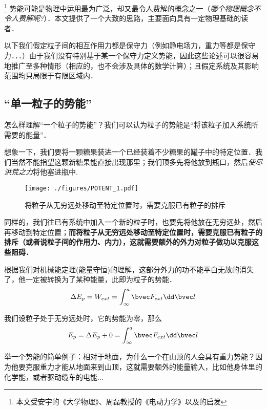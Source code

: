 

\begin{issues}
\issueDraft
\end{issues}

\footnote{本文受安宇的《大学物理》、周磊教授的《电动力学》以及\cite{GriffE}的启发} 势能可能是物理中运用最为广泛，却又最令人费解的概念之一（\textsl{哪个物理概念不令人费解呢?}）．本文提供了一个大致的思路，主要面向具有一定物理基础的读者．

以下我们假定粒子间的相互作用力都是保守力（例如静电场力，重力等都是保守力．．．）由于我们没有特别基于某一个保守力定义势能，因此这些论述可以很容易地推广至多种情形（相应的，也不会涉及具体的数学计算）；且假定系统及其影响范围均只局限于有限区域内．

\subsection{“单一粒子的势能”}
怎么样理解“一个粒子的势能”？我们可以认为粒子的势能是“将该粒子加入系统所需要的能量”．

想象一下，我们要将一颗糖果装进一个已经装着不少糖果的罐子中的特定位置．我们当然不能指望这颗新糖果能直接出现那里；我们顶多先将他放到瓶口，然后\textsl{使尽洪荒之力}将他塞进瓶中.

\begin{figure}[ht]
\centering
\texttt{[image: ./figures/POTENT\_1.pdf]}
\caption{将粒子从无穷远处移动至特定位置时，需要克服已有粒子的排斥} \label{POTENT_fig1}
\end{figure}

同样的，我们往已有系统中加入一个新的粒子时，也要先将他放在无穷远处，然后再移动到特定位置；\textbf{而将粒子从无穷远处移动至特定位置时，需要克服已有粒子的排斥（或者说粒子间的作用力、内力），这就需要额外的外力对粒子做功以克服这些阻碍．}

根据我们对机械能定理(能量守恒)的理解，这部分外力的功不能平白无故的消失了，他一定被转换为了某种能量，此即为粒子的势能．
$$\Delta E_p = W_{ext}=\int^a_\infty \bvec F_{ext} \dd \bvec l $$

我们设粒子处于无穷远处时，它的势能为零，那么
$$E_p = \Delta E_p + 0 = \int^a_\infty \bvec F_{ext} \dd \bvec l$$

举一个势能的简单例子：相对于地面，为什么一个在山顶的人会具有重力势能？因为他要克服重力才能从地面来到山顶，这就需要额外的能量输入，比如他身体里的化学能，或者驱动缆车的电能...

